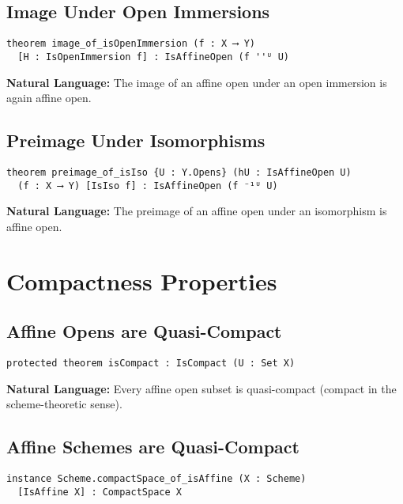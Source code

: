 \documentclass{article}
\theoremstyle{definition}
\begin{document}
\subsection{Image Under Open Immersions}

\begin{lstlisting}
theorem image_of_isOpenImmersion (f : X ⟶ Y)
  [H : IsOpenImmersion f] : IsAffineOpen (f ''ᵁ U)
\end{lstlisting}

\textbf{Natural Language:} The image of an affine open under an open immersion is again affine open.

\subsection{Preimage Under Isomorphisms}

\begin{lstlisting}
theorem preimage_of_isIso {U : Y.Opens} (hU : IsAffineOpen U)
  (f : X ⟶ Y) [IsIso f] : IsAffineOpen (f ⁻¹ᵁ U)
\end{lstlisting}

\textbf{Natural Language:} The preimage of an affine open under an isomorphism is affine open.

\section{Compactness Properties}

\subsection{Affine Opens are Quasi-Compact}

\begin{lstlisting}
protected theorem isCompact : IsCompact (U : Set X)
\end{lstlisting}

\textbf{Natural Language:} Every affine open subset is quasi-compact (compact in the scheme-theoretic sense).

\subsection{Affine Schemes are Quasi-Compact}

\begin{lstlisting}
instance Scheme.compactSpace_of_isAffine (X : Scheme)
  [IsAffine X] : CompactSpace X
\end{lstlisting}
\end{document}
